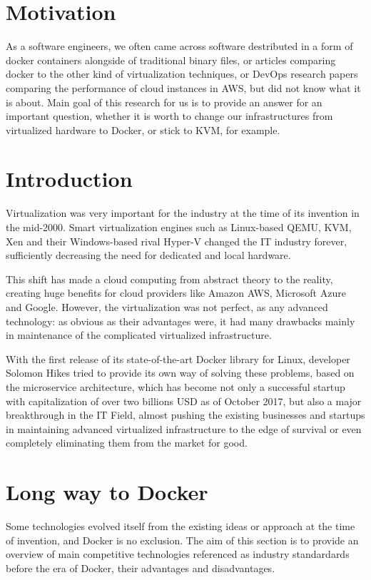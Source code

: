 
\section{Motivation}

As a software engineers,
we often came across software destributed
in a form of docker containers alongside
of traditional binary files,
or articles comparing docker to the other kind of virtualization techniques,
or DevOps research papers comparing the performance of cloud instances in AWS,
but did not know what it is about.
Main goal of this research for us is to provide an answer
for an important question, whether it is worth
to change our infrastructures
from virtualized hardware to Docker, or stick to KVM, for example.

\section{Introduction}

Virtualization was very important for the industry at the time of its invention in the mid-2000.
Smart virtualization engines such as Linux-based QEMU, KVM, Xen and their Windows-based rival Hyper-V changed the IT industry forever,
sufficiently decreasing the need for dedicated and local hardware.

This shift has made a cloud computing from abstract theory to the reality,
creating huge benefits for cloud providers like Amazon AWS, Microsoft Azure and Google.
However, the virtualization was not perfect, as any advanced technology:
as obvious as their advantages were,
it had many drawbacks mainly in maintenance of the complicated virtualized infrastructure.

With the first release of its state-of-the-art Docker library for Linux,
developer Solomon Hikes tried to provide its own way of solving these problems,
based on the microservice architecture, which has become not only a successful startup
with capitalization of over two billions USD as of October 2017,
but also a major breakthrough in the IT Field, almost pushing the existing
businesses and startups in maintaining advanced virtualized infrastructure
to the edge of survival or even completely eliminating them from the market for good.

\section{Long way to Docker}

Some technologies evolved itself from the existing ideas or approach at the time of invention, and Docker is no exclusion.
The aim of this section is to provide an overview of main competitive
technologies referenced as industry standardards before the era of Docker, their advantages and disadvantages.

